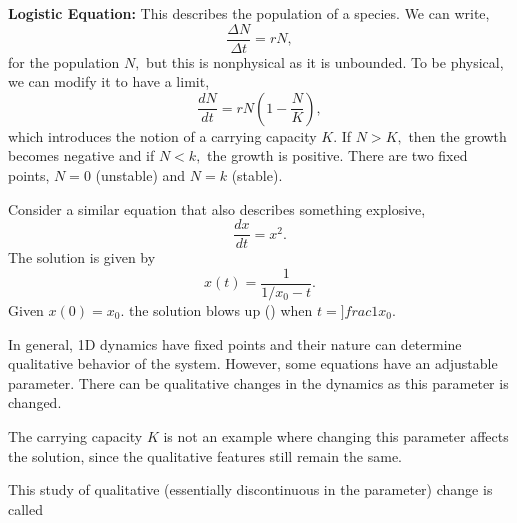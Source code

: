 \documentclass{article}
\numberwithin{equation}{section}
\begin{document}
\begin{example}
    \textbf{Logistic Equation:} This describes the population of a species. We can write,
    \begin{equation*}
        \frac{\Delta N}{\Delta t} = rN,
    \end{equation*}
    for the population $N,$ but this is nonphysical as it is unbounded. To be physical, we can modify it to have a limit,
    \begin{equation*}
        \frac{dN}{dt} = rN\left(1 - \frac{N}{K}\right),
    \end{equation*}
    which introduces the notion of a carrying capacity $K$. If $N>K,$ then the growth becomes negative and if $N<k,$ the growth is positive. There are two fixed points, $N=0$ (unstable) and $N=k$ (stable).
\end{example}
\begin{example}
    Consider a similar equation that also describes something explosive,
    \begin{equation*}
        \frac{dx}{dt} = x^2.
    \end{equation*}
    The solution is given by 
    \begin{equation*}
        x(t) = \frac{1}{1/x_0 - t}.
    \end{equation*}
    Given $x(0)=x_0.$ the solution blows up () when $t=]frac{1}{x_0}.$
\end{example}
In general, 1D dynamics have fixed points and their nature can determine qualitative behavior of the system. However, some equations have an adjustable parameter. There can be qualitative changes in the dynamics as this parameter is changed.
\begin{warning}
    The carrying capacity $K$ is not an example where changing this parameter affects the solution, since the qualitative features still remain the same.
\end{warning}
This study of qualitative (essentially discontinuous in the parameter) change is called 
\end{document}

